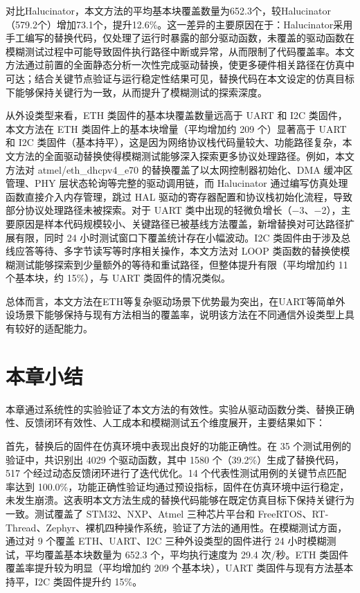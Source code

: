 对比Halucinator，本文方法的平均基本块覆盖数量为652.3个，较Halucinator（579.2个）增加73.1个，提升12.6\%。这一差异的主要原因在于：Halucinator采用手工编写的替换代码，仅处理了运行时暴露的部分驱动函数，未覆盖的驱动函数在模糊测试过程中可能导致固件执行路径中断或异常，从而限制了代码覆盖率。本文方法通过前置的全面静态分析一次性完成驱动替换，使更多硬件相关路径在仿真中可达；结合关键节点验证与运行稳定性结果可见，替换代码在本文设定的仿真目标下能够保持关键行为一致，从而提升了模糊测试的探索深度。

从外设类型来看，ETH 类固件的基本块覆盖数量远高于 UART 和 I2C 类固件，本文方法在 ETH 类固件上的基本块增量（平均增加约 209 个）显著高于 UART 和 I2C 类固件（基本持平），这是因为网络协议栈代码量较大、功能路径复杂，本文方法的全面驱动替换使得模糊测试能够深入探索更多协议处理路径。例如，本文方法对 atmel/eth\_dhcpv4\_e70 的替换覆盖了以太网控制器初始化、DMA 缓冲区管理、PHY 层状态轮询等完整的驱动调用链，而 Halucinator 通过编写仿真处理函数直接介入内存管理，跳过 HAL 驱动的寄存器配置和协议栈初始化流程，导致部分协议处理路径未被探索。对于 UART 类中出现的轻微负增长（$-$3、$-$2），主要原因是样本代码规模较小、关键路径已被基线方法覆盖，新增替换对可达路径扩展有限，同时 24 小时测试窗口下覆盖统计存在小幅波动。I2C 类固件由于涉及总线应答等待、多字节读写等时序相关操作，本文方法对 LOOP 类函数的替换使模糊测试能够探索到少量额外的等待和重试路径，但整体提升有限（平均增加约 11 个基本块，约 15\%），与 UART 类固件的情况类似。

总体而言，本文方法在ETH等复杂驱动场景下优势最为突出，在UART等简单外设场景下能够保持与现有方法相当的覆盖率，说明该方法在不同通信外设类型上具有较好的适配能力。

\section{本章小结}
\label{sec:chap5_summary}

本章通过系统性的实验验证了本文方法的有效性。实验从驱动函数分类、替换正确性、反馈闭环有效性、人工成本和模糊测试五个维度展开，主要结果如下：

首先，替换后的固件在仿真环境中表现出良好的功能正确性。在 35 个测试用例的验证中，共识别出 4029 个驱动函数，其中 1580 个（39.2\%）生成了替换代码，517 个经过动态反馈闭环进行了迭代优化。14 个代表性测试用例的关键节点匹配率达到 100.0\%，功能正确性验证均通过预设指标，固件在仿真环境中运行稳定，未发生崩溃。这表明本文方法生成的替换代码能够在既定仿真目标下保持关键行为一致。测试覆盖了 STM32、NXP、Atmel 三种芯片平台和 FreeRTOS、RT-Thread、Zephyr、裸机四种操作系统，验证了方法的通用性。在模糊测试方面，通过对 9 个覆盖 ETH、UART、I2C 三种外设类型的固件进行 24 小时模糊测试，平均覆盖基本块数量为 652.3 个，平均执行速度为 29.4 次/秒。ETH 类固件覆盖率提升较为明显（平均增加约 209 个基本块），UART 类固件与现有方法基本持平，I2C 类固件提升约 15\%。

